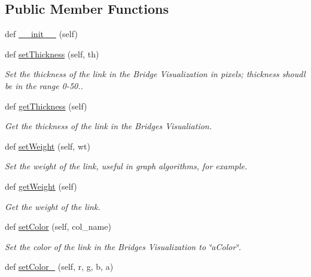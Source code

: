 \subsection*{Public Member Functions}
\begin{DoxyCompactItemize}
\item 
def \hyperlink{class_link_visualizer_1_1_link_visualizer_af672a41789fed6cf222a2f531f726944}{\+\_\+\+\_\+init\+\_\+\+\_\+} (self)
\item 
def \hyperlink{class_link_visualizer_1_1_link_visualizer_a2ceb405cd49aae8d9b21f98a9b3bb0de}{set\+Thickness} (self, th)
\begin{DoxyCompactList}\small\item\em Set the thickness of the link in the Bridge Visualization in pixels; thickness shoudl be in the range 0-\/50.. \end{DoxyCompactList}\item 
def \hyperlink{class_link_visualizer_1_1_link_visualizer_a4d19046b2ecde2d7e5a7b339bd2fc694}{get\+Thickness} (self)
\begin{DoxyCompactList}\small\item\em Get the thickness of the link in the Bridges Visualiation. \end{DoxyCompactList}\item 
def \hyperlink{class_link_visualizer_1_1_link_visualizer_add17648c2235c5c712f0ef5139d96454}{set\+Weight} (self, wt)
\begin{DoxyCompactList}\small\item\em Set the weight of the link, useful in graph algorithms, for example. \end{DoxyCompactList}\item 
def \hyperlink{class_link_visualizer_1_1_link_visualizer_a1db99a28827873c2c6870eaab345994c}{get\+Weight} (self)
\begin{DoxyCompactList}\small\item\em Get the weight of the link. \end{DoxyCompactList}\item 
def \hyperlink{class_link_visualizer_1_1_link_visualizer_a221d25adb57aa6a4b08a21b4187d6f5e}{set\+Color} (self, col\+\_\+name)
\begin{DoxyCompactList}\small\item\em Set the color of the link in the Bridges Visualization to \char`\"{}a\+Color\char`\"{}. \end{DoxyCompactList}\item 
def \hyperlink{class_link_visualizer_1_1_link_visualizer_ac7e87dc16254a57290fd1738312193cc}{set\+Color\+\_} (self, r, g, b, a)

\end{DoxyCompactItemize}
